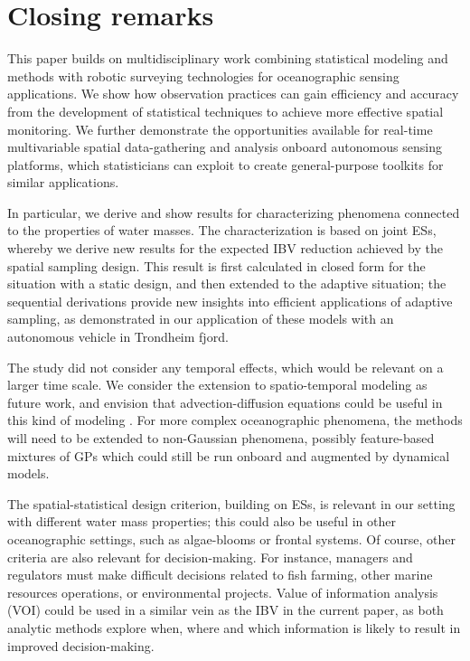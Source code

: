 \documentclass[aoas]{imsart}
\begin{document}

\section{Closing remarks}\label{sec:concl_disc}

This paper builds on multidisciplinary work combining statistical modeling and methods with robotic surveying technologies for oceanographic sensing applications. We show how  observation practices can gain efficiency and accuracy from the development of statistical techniques to achieve more effective spatial monitoring. We further demonstrate the opportunities available for real-time multivariable spatial data-gathering and analysis onboard autonomous sensing platforms, which statisticians can exploit to create general-purpose toolkits for similar applications. 

In particular, we derive and show results for characterizing phenomena connected to the properties of water masses. The characterization is based on joint ESs, whereby we derive new results for the expected IBV reduction achieved by the spatial sampling design. This result is first calculated in closed form for the situation with a static design, and then extended to the adaptive situation; the sequential derivations  provide new insights into efficient applications of adaptive sampling, as demonstrated in our application of these models with an autonomous vehicle in Trondheim fjord.

The study did not consider any temporal effects, which would be relevant on a larger time scale. We consider the extension to spatio-temporal modeling as future work, and envision that advection-diffusion equations could be useful in this kind of modeling \citep{sigrist2015stochastic}. For more complex oceanographic phenomena, the methods will need to be extended to non-Gaussian phenomena, possibly feature-based mixtures of GPs which could still be run onboard and augmented by dynamical models. 

The spatial-statistical design criterion, building on ESs, is relevant in our setting with different water mass properties; this could also be useful in other oceanographic settings, such as algae-blooms or frontal systems. Of course, other criteria are also relevant for decision-making.  For instance, managers and regulators must make difficult decisions related to fish farming, other marine resources operations, or environmental projects. Value of information analysis (VOI) \citep{Eidsvik:15} could be used in a similar vein as the IBV in the current paper, as both analytic methods explore when, where and which information is likely to result in improved decision-making. 
\end{document}
